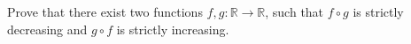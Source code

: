 Prove that there exist two functions $f,g : \mathbb{R} \to \mathbb{R}$, such that $f\circ g$ is strictly decreasing and $g\circ f$ is strictly increasing.